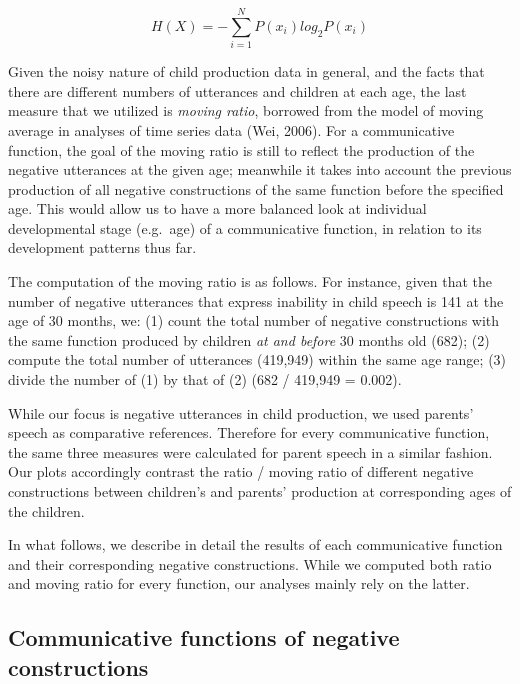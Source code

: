 \documentclass[10pt, letterpaper]{article}
\begin{document}
\begin{equation}
H(X) = -\sum_{i=1}^N P(x_i)log_2P(x_i) 
\end{equation}

Given the noisy nature of child production data in general, and the
facts that there are different numbers of utterances and children at
each age, the last measure that we utilized is \emph{moving ratio},
borrowed from the model of moving average in analyses of time series
data (Wei, 2006). For a communicative function, the goal of the moving
ratio is still to reflect the production of the negative utterances at
the given age; meanwhile it takes into account the previous production
of all negative constructions of the same function before the specified
age. This would allow us to have a more balanced look at individual
developmental stage (e.g.~age) of a communicative function, in relation
to its development patterns thus far.

The computation of the moving ratio is as follows. For instance, given
that the number of negative utterances that express inability in child
speech is 141 at the age of 30 months, we: (1) count the total number of
negative constructions with the same function produced by children
\emph{at and before} 30 months old (682); (2) compute the total number
of utterances (419,949) within the same age range; (3) divide the number
of (1) by that of (2) (682 / 419,949 = 0.002).

While our focus is negative utterances in child production, we used
parents' speech as comparative references. Therefore for every
communicative function, the same three measures were calculated for
parent speech in a similar fashion. Our plots accordingly contrast the
ratio / moving ratio of different negative constructions between
children's and parents' production at corresponding ages of the
children.

In what follows, we describe in detail the results of each communicative
function and their corresponding negative constructions. While we
computed both ratio and moving ratio for every function, our analyses
mainly rely on the latter.

\hypertarget{communicative-functions-of-negative-constructions}{%
\subsection{Communicative functions of negative
constructions}\label{communicative-functions-of-negative-constructions}}
\end{document}
